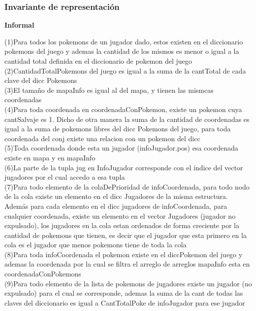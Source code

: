 \begin{Representacion}
\subsubsection{Invariante de representación}

\textbf{Informal}

(1)Para todos los pokemons de un jugador dado, estos existen en el diccionario pokemons del juego y ademas la cantidad de los mismos es menor o igual a la cantidad total definida en el diccionario de pokemon del juego\\

(2)CantidadTotalPokemons del juego es igual a la suma de la cantTotal de cada clave del dicc Pokemons\\

(3)El tamaño de mapaInfo es igual al del mapa, y tienen las mismcas coordenadas\\

(4)Para toda coordenada en coordenadaConPokemon, existe un pokemon cuya cantSalvaje es 1. Dicho de otra manera la suma de la cantidad de coordenadas es igual a la suma de pokemons libres del dicc Pokemons del juego, para toda coordenada del conj existe una relacion con un pokemon del dicc\\

(5)Toda coordenada donde esta un jugador (infoJugador.pos) esa coordenada existe en mapa y en mapaInfo\\

(6)La parte de la tupla jug en InfoJugador corresponde con el índice del vector jugadores por el cual accedo a esa tupla\\

(7)Para todo elemento de la colaDePrioridad de infoCoordenada, para todo nodo de la cola existe un elemento en el dicc Jugadores de la misma estructura. Además para cada elemento en el dicc jugadores de infoCoordenada, para cualquier coordenada, existe un elemento en el vector Jugadores (jugador no expulsado), los jugadores en la cola estan ordenados de forma creciente por la cantidad de pokemons que tienen, es decir que el jugador que esta primero en la cola es el jugador que menos pokemons tiene de toda la cola\\

(8)Para toda infoCoordenada el pokemon existe en el diccPokemon del juego y ademas la coordenada por la cual se filtra el arreglo de arreglos mapaInfo esta en coordenadaConPokemons \\

(9)Para todo elemento de la lista de pokemons de jugadores existe un jugador (no expulsado) para el cual se corresponde, ademas la suma de la cant de todas las claves del diccionario es igual a CantTotalPoke de infoJugador para ese jugador\\


\end{Representacion}
